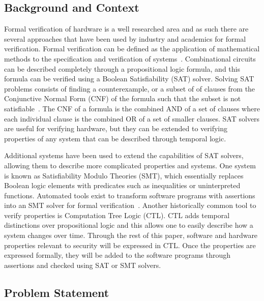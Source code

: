 \documentclass[../report.tex]{subfiles}
\begin{document}
\subsection{Background and Context}

Formal verification of hardware is a well researched area and as such there are several approaches that have been used by industry and academics for formal verification.
Formal verification can be defined as the application of mathematical methods to the specification and verification of systems~\cite{greenstreet}.
Combinational circuits can be described completely through a propositional logic formula, and this formula can be verified using a Boolean Satisfiability (SAT) solver.
Solving SAT problems consists of finding a counterexample, or a subset of of clauses from the Conjunctive Normal Form (CNF) of the formula such that the subset is not satisfiable~\cite{validating-sat}.
The CNF of a formula is the combined AND of a set of clauses where each individual clause is the combined OR of a set of smaller clauses.
SAT solvers are useful for verifying hardware, but they can be extended to verifying properties of any system that can be described through temporal logic.

Additional systems have been used to extend the capabilities of SAT solvers, allowing them to describe more complicated properties and systems. 
One system is known as Satisfiability Modulo Theories (SMT), which essentially replaces Boolean logic elements with predicates such as inequalities or uninterpreted functions. 
Automated tools exist to transform software programs with assertions into an SMT solver for formal verification~\cite{z3-smt-solver}.
Another historically common tool to verify properties is Computation Tree Logic (CTL).
CTL adds temporal distinctions over propositional logic and this allows one to easily describe how a system changes over time.
Through the rest of this paper, software and hardware properties relevant to security will be expressed in CTL\@. 
Once the properties are expressed formally, they will be added to the software programs through assertions and checked using SAT or SMT solvers.

\subsection{Problem Statement}
\end{document}
